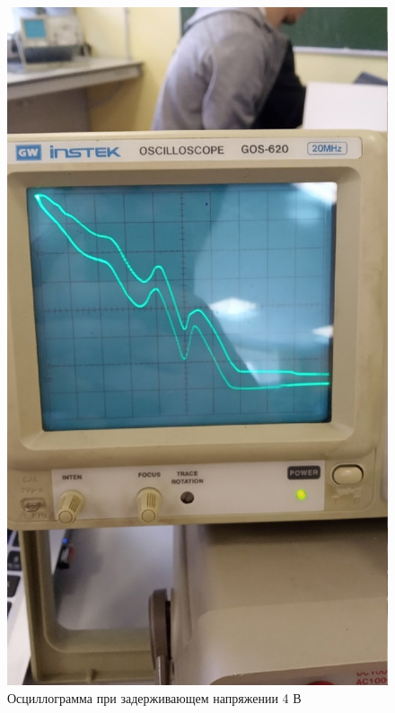 \documentclass[a4paper, 12pt]{article}
\begin{document}
\begin{enumerate}
\begin{figure}[h]
\begin{center}
\begin{minipage}[h]{0.45\linewidth}
\includegraphics[width=1\linewidth]{4_V.jpg}
\caption{Осциллограмма при задерживающем напряжении 4 В} %
\label{ris:experimoriginal} %
\end{minipage}
\hfill 
\end{center}
\end{figure}


\end{enumerate}
\end{document}
